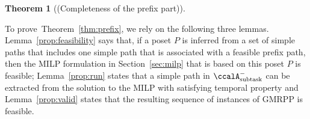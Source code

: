 \documentclass[Afour,sageh,times]{sagej}
\makeatletter
\newtheorem{thm}{Theorem}[section]
\newtheorem{cor}[thm]{Corollary}
\newcommand{\ltl}{ {\it LTL}$_{-\bigcirc}$ }
\newcommand{\auto}[1]{\ccalA_{\textup{#1}}}
\newcommand{\autop}{\ccalA_{\phi}}
\newcommand{\vertex}[1]{v_{\textup{#1}}}
\newcommand{\scriptveryshortarrow}[1][3pt]{{%
    \hbox{\rule[\scriptratio\dimexpr\fontdimen22\textfont2-.2pt\relax]
               {\scriptratio\dimexpr#1\relax}{\scriptratio\dimexpr.4pt\relax}}%
   \mkern-4mu\hbox{\let\f@size\sf@size\usefont{U}{lasy}{m}{n}\symbol{41}}}}
\makeatother
\begin{document}
{\begin{thm}[(Completeness of the prefix part)]
\end{thm}

To prove~Theorem~\ref{thm:prefix}, we rely on the following three lemmas.
Lemma~\ref{prop:feasibility} says that, if a poset $P$ is inferred from a set of simple paths that includes  one simple path that is associated with a feasible prefix path, then the MILP formulation in Section~\ref{sec:milp} that is based on this poset $P$ is feasible; Lemma~\ref{prop:run} states that a simple path in $\auto{subtask}^-$ can be extracted from the solution to the MILP with satisfying temporal property and Lemma~\ref{prop:valid} states that the resulting sequence of instances of GMRPP is feasible.

}
\end{document}
